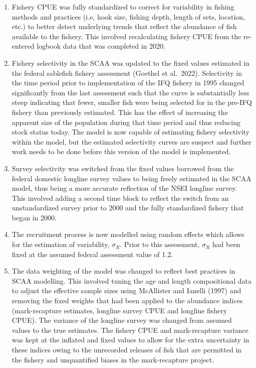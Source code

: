 \documentclass[
]{article}
\providecommand{\tightlist}{%
  \setlength{\itemsep}{0pt}\setlength{\parskip}{0pt}}
\begin{document}
\begin{enumerate}
\def\labelenumi{\arabic{enumi}.}
\tightlist
\item
  Fishery CPUE was fully standardized to correct for variability in fishing methods and practices (i.e, hook size, fishing depth, length of sets, location, etc.) to better detect underlying trends that reflect the abundance of fish available to the fishery. This involved recalculating fishery CPUE from the re-entered logbook data that was completed in 2020.
\item
  Fishery selectivity in the SCAA was updated to the fixed values estimated in the federal sablefish fishery assessment (Goethel et al.~2022). Selectivity in the time period prior to implementation of the IFQ fishery in 1995 changed significantly from the last assessment such that the curve is substantially less steep indicating that fewer, smaller fish were being selected for in the pre-IFQ fishery than previously estimated. This has the effect of increasing the apparent size of the population during that time period and thus reducing stock status today. The model is now capable of estimating fishery selectivity within the model, but the estimated selectivity curves are suspect and further work needs to be done before this version of the model is implemented.
\item
  Survey selectivity was switched from the fixed values borrowed from the federal domestic longline survey values to being freely estimated in the SCAA model, thus being a more accurate reflection of the NSEI longline survey. This involved adding a second time block to reflect the switch from an unstandardized survey prior to 2000 and the fully standardized fishery that began in 2000.
\item
  The recruitment process is now modelled using random effects which allows for the estimation of variability, \(\sigma_R\). Prior to this assessment, \(\sigma_R\) had been fixed at the assumed federal assessment value of 1.2.\\
\item
  The data weighting of the model was changed to reflect best practices in SCAA modelling. This involved tuning the age and length compositional data to adjust the effective sample sizes using McAllister and Ianelli (1997) and removing the fixed weights that had been applied to the abundance indices (mark-recapture estimates, longline survey CPUE and longline fishery CPUE). The variance of the longline survey was changed from assumed values to the true estimates. The fishery CPUE and mark-recapture variance was kept at the inflated and fixed values to allow for the extra uncertainty in these indices owing to the unrecorded releases of fish that are permitted in the fishery and unquantified biases in the mark-recapture project.
\end{enumerate}
\end{document}
